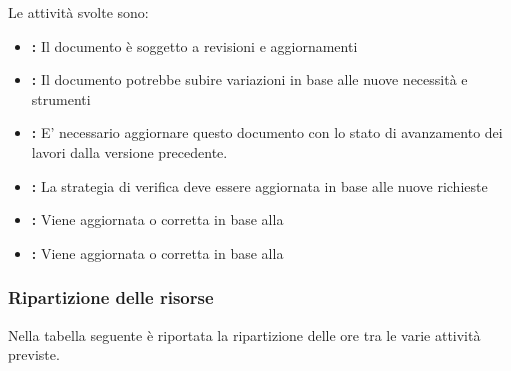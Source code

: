 \documentclass[12pt,a4paper]{article}
\begin{document}
Le attività svolte sono:
\begin{itemize}
	\item \textbf{\AdR{}:} 
	Il documento è soggetto a revisioni e aggiornamenti
	\item \textbf{\NdP{}:}
	Il documento potrebbe subire variazioni in base alle nuove necessità e strumenti
	\item \textbf{\PdP{}:}
	E' necessario aggiornare questo documento con lo stato di avanzamento dei lavori dalla versione precedente.
	\item \textbf{\PdQ{}:}
	La strategia di verifica deve essere aggiornata in base alle nuove richieste
	\item \textbf{\ST{}:}
	Viene aggiornata o corretta in base alla \RP{}
	\item \textbf{\DP{}:} 
	Viene aggiornata o corretta in base alla \RP{}
\end{itemize}

\newpage
\subsubsection{Ripartizione delle risorse}
Nella tabella seguente è riportata la ripartizione delle ore tra le varie attività previste.
\end{document}
